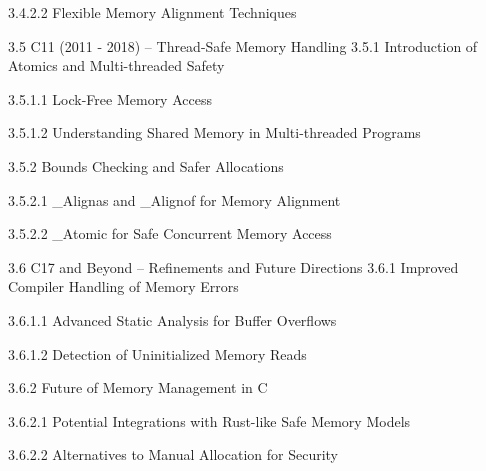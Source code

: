 3.4.2.2 Flexible Memory Alignment Techniques

3.5 C11 (2011 - 2018) – Thread-Safe Memory Handling
3.5.1 Introduction of Atomics and Multi-threaded Safety

3.5.1.1 Lock-Free Memory Access

3.5.1.2 Understanding Shared Memory in Multi-threaded Programs

3.5.2 Bounds Checking and Safer Allocations

3.5.2.1 _Alignas and _Alignof for Memory Alignment

3.5.2.2 _Atomic for Safe Concurrent Memory Access

3.6 C17 and Beyond – Refinements and Future Directions
3.6.1 Improved Compiler Handling of Memory Errors

3.6.1.1 Advanced Static Analysis for Buffer Overflows

3.6.1.2 Detection of Uninitialized Memory Reads

3.6.2 Future of Memory Management in C

3.6.2.1 Potential Integrations with Rust-like Safe Memory Models

3.6.2.2 Alternatives to Manual Allocation for Security
